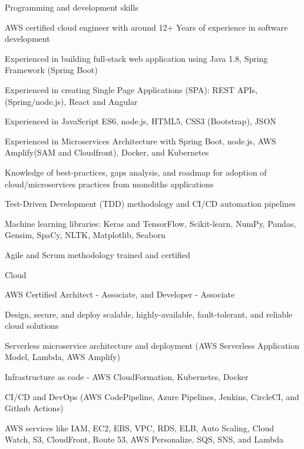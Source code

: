 \begin{cventries}
  \cventry
    {Programming and development skills}
    {}
    {}
    {}
    {
      \begin{cvitems}
        \item { AWS certified cloud engineer with around 12+ Years of experience in software development}
        \item {Experienced in building full-stack web application using Java 1.8, Spring Framework (Spring Boot)}
        \item {Experienced in creating Single Page Applications (SPA): REST APIs, (Spring/node.js), React and Angular}
        \item {Experienced in JavaScript ES6, node.js, HTML5, CSS3 (Bootstrap), JSON} 
        \item {Experienced in Microservices Architecture with Spring Boot, node.js, AWS Amplify(SAM and Cloudfront), Docker, and Kubernetes }
        \item {Knowledge of best-practices, gaps analysis, and roadmap for adoption of cloud/microservices practices from monoliths applications }
        \item {Test-Driven Development (TDD) methodology and CI/CD automation pipelines}
        \item {Machine learning libraries: Keras and TensorFlow, Scikit-learn, NumPy, Pandas, Gensim, SpaCy, NLTK, Matplotlib, Seaborn }
        \item {Agile and Scrum methodology trained and certified}
      \end{cvitems}
    }
    
\vspace{-1em}

    \cventry
    {Cloud}
    {}
    {}
    {}
    {
      \begin{cvitems}
        \item {AWS Certified Architect - Associate, and Developer - Associate }
        \item {Design, secure, and deploy scalable, highly-available, fault-tolerant, and reliable cloud solutions}
        \item {Serverless microservice architecture and deployment (AWS Serverless Application Model, Lambda, AWS Amplify) }
        \item {Infrastructure as code - AWS CloudFormation, Kubernetes, Docker }
        \item {CI/CD and DevOps (AWS CodePipeline, Azure Pipelines, Jenkins, CircleCI, and Github Actions)}
        \item { AWS services like IAM, EC2, EBS, VPC, RDS, ELB, Auto Scaling, Cloud Watch, S3, CloudFront, Route 53, AWS Personalize, SQS, SNS, and Lambda }
      \end{cvitems}
    }
    

\end{cventries}
